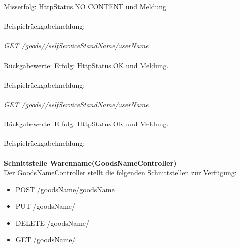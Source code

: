 \tab \tab 								Misserfolg: HttpStatus.NO CONTENT und Meldung\\
\\
Beispielrückgabelmeldung:	
\\
\\
\textit{\underline{GET /goods//{selfServiceStandName}/{userName}}}
\\
\\
Rückgabewerte: \tab 					Erfolg: HttpStatus.OK und Meldung.\\
\\
Beispielrückgabelmeldung:	
\\
\\
\textit{\underline{GET /goods//{selfServiceStandName}/{userName}}}
\\
\\
Rückgabewerte: \tab 					Erfolg: HttpStatus.OK und Meldung.\\
\\
Beispielrückgabelmeldung:	
\\
\\

\textbf{Schnittstelle Warenname(GoodsNameController)}
\\
Der GoodsNameController stellt die folgenden Schnittstellen zur Verfügung:

\begin{itemize}
	\itemsep0pt
	\item  POST /goodsName/{goodsName}
	\item  PUT /goodsName/
	\item  DELETE /goodsName/
	\item  GET /goodsName/

\end{itemize}


